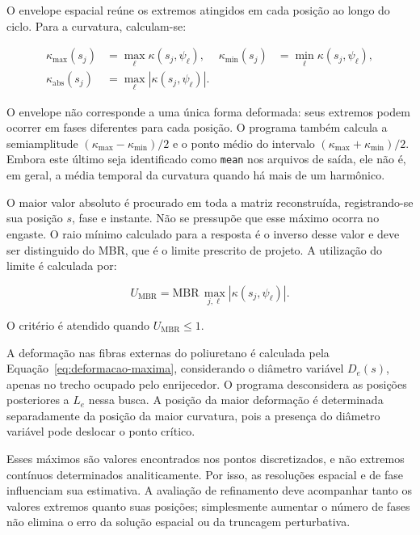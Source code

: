 \documentclass[arial,centeredequations,english,brazilian,oneside,section=TITLE]{ifes8}
\begin{document}
O envelope espacial reúne os extremos atingidos em cada posição ao longo
do ciclo. Para a curvatura, calculam-se:

\begin{align}
  \kappa_{\max}(s_j)&=\max_\ell\kappa(s_j,\psi_\ell),&
  \kappa_{\min}(s_j)&=\min_\ell\kappa(s_j,\psi_\ell),
    \label{eq:envelope-curvatura-extremos}\\
  \kappa_{\mathrm{abs}}(s_j)&=\max_\ell|\kappa(s_j,\psi_\ell)|.
    \label{eq:envelope-curvatura-absoluta}
\end{align}

O envelope não corresponde a uma única forma deformada: seus extremos
podem ocorrer em fases diferentes para cada posição. O programa também
calcula a semiamplitude
$(\kappa_{\max}-\kappa_{\min})/2$ e o ponto médio do intervalo
$(\kappa_{\max}+\kappa_{\min})/2$. Embora este último seja identificado
como \texttt{mean} nos arquivos de saída, ele não é, em geral, a média
temporal da curvatura quando há mais de um harmônico.

O maior valor absoluto é procurado em toda a matriz reconstruída, registrando-se
sua posição $s$, fase e instante. Não se pressupõe que esse máximo ocorra
no engaste. O raio mínimo calculado para a resposta é o inverso desse
valor e deve ser distinguido do MBR, que é o limite prescrito de projeto.
A utilização do limite é calculada por:

\begin{equation}
  U_{\mathrm{MBR}}=\mathrm{MBR}\,
    \max_{j,\ell}|\kappa(s_j,\psi_\ell)|.
  \label{eq:utilizacao-mbr-reconstrucao}
\end{equation}

O critério é atendido quando $U_{\mathrm{MBR}}\leq1$.

A deformação nas fibras externas do poliuretano é calculada pela
Equação~\eqref{eq:deformacao-maxima}, considerando o diâmetro variável
$D_e(s)$, apenas no trecho ocupado pelo enrijecedor. O programa desconsidera
as posições posteriores a $L_e$ nessa busca. A posição da maior deformação
é determinada separadamente da posição da maior curvatura, pois a presença
do diâmetro variável pode deslocar o ponto crítico.

Esses máximos são valores encontrados nos pontos discretizados, e não extremos
contínuos determinados analiticamente. Por isso, as resoluções espacial e de
fase influenciam sua estimativa. A avaliação de refinamento deve acompanhar
tanto os valores extremos quanto suas posições; simplesmente aumentar o
número de fases não elimina o erro da solução espacial ou da truncagem
perturbativa.
\end{document}
